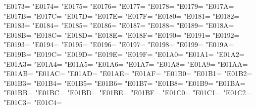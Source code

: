 \XeTeXcharclass"E0173=\KclassCM
\XeTeXcharclass"E0174=\KclassCM
\XeTeXcharclass"E0175=\KclassCM
\XeTeXcharclass"E0176=\KclassCM
\XeTeXcharclass"E0177=\KclassCM
\XeTeXcharclass"E0178=\KclassCM
\XeTeXcharclass"E0179=\KclassCM
\XeTeXcharclass"E017A=\KclassCM
\XeTeXcharclass"E017B=\KclassCM
\XeTeXcharclass"E017C=\KclassCM
\XeTeXcharclass"E017D=\KclassCM
\XeTeXcharclass"E017E=\KclassCM
\XeTeXcharclass"E017F=\KclassCM
\XeTeXcharclass"E0180=\KclassCM
\XeTeXcharclass"E0181=\KclassCM
\XeTeXcharclass"E0182=\KclassCM
\XeTeXcharclass"E0183=\KclassCM
\XeTeXcharclass"E0184=\KclassCM
\XeTeXcharclass"E0185=\KclassCM
\XeTeXcharclass"E0186=\KclassCM
\XeTeXcharclass"E0187=\KclassCM
\XeTeXcharclass"E0188=\KclassCM
\XeTeXcharclass"E0189=\KclassCM
\XeTeXcharclass"E018A=\KclassCM
\XeTeXcharclass"E018B=\KclassCM
\XeTeXcharclass"E018C=\KclassCM
\XeTeXcharclass"E018D=\KclassCM
\XeTeXcharclass"E018E=\KclassCM
\XeTeXcharclass"E018F=\KclassCM
\XeTeXcharclass"E0190=\KclassCM
\XeTeXcharclass"E0191=\KclassCM
\XeTeXcharclass"E0192=\KclassCM
\XeTeXcharclass"E0193=\KclassCM
\XeTeXcharclass"E0194=\KclassCM
\XeTeXcharclass"E0195=\KclassCM
\XeTeXcharclass"E0196=\KclassCM
\XeTeXcharclass"E0197=\KclassCM
\XeTeXcharclass"E0198=\KclassCM
\XeTeXcharclass"E0199=\KclassCM
\XeTeXcharclass"E019A=\KclassCM
\XeTeXcharclass"E019B=\KclassCM
\XeTeXcharclass"E019C=\KclassCM
\XeTeXcharclass"E019D=\KclassCM
\XeTeXcharclass"E019E=\KclassCM
\XeTeXcharclass"E019F=\KclassCM
\XeTeXcharclass"E01A0=\KclassCM
\XeTeXcharclass"E01A1=\KclassCM
\XeTeXcharclass"E01A2=\KclassCM
\XeTeXcharclass"E01A3=\KclassCM
\XeTeXcharclass"E01A4=\KclassCM
\XeTeXcharclass"E01A5=\KclassCM
\XeTeXcharclass"E01A6=\KclassCM
\XeTeXcharclass"E01A7=\KclassCM
\XeTeXcharclass"E01A8=\KclassCM
\XeTeXcharclass"E01A9=\KclassCM
\XeTeXcharclass"E01AA=\KclassCM
\XeTeXcharclass"E01AB=\KclassCM
\XeTeXcharclass"E01AC=\KclassCM
\XeTeXcharclass"E01AD=\KclassCM
\XeTeXcharclass"E01AE=\KclassCM
\XeTeXcharclass"E01AF=\KclassCM
\XeTeXcharclass"E01B0=\KclassCM
\XeTeXcharclass"E01B1=\KclassCM
\XeTeXcharclass"E01B2=\KclassCM
\XeTeXcharclass"E01B3=\KclassCM
\XeTeXcharclass"E01B4=\KclassCM
\XeTeXcharclass"E01B5=\KclassCM
\XeTeXcharclass"E01B6=\KclassCM
\XeTeXcharclass"E01B7=\KclassCM
\XeTeXcharclass"E01B8=\KclassCM
\XeTeXcharclass"E01B9=\KclassCM
\XeTeXcharclass"E01BA=\KclassCM
\XeTeXcharclass"E01BB=\KclassCM
\XeTeXcharclass"E01BC=\KclassCM
\XeTeXcharclass"E01BD=\KclassCM
\XeTeXcharclass"E01BE=\KclassCM
\XeTeXcharclass"E01BF=\KclassCM
\XeTeXcharclass"E01C0=\KclassCM
\XeTeXcharclass"E01C1=\KclassCM
\XeTeXcharclass"E01C2=\KclassCM
\XeTeXcharclass"E01C3=\KclassCM
\XeTeXcharclass"E01C4=\KclassCM
